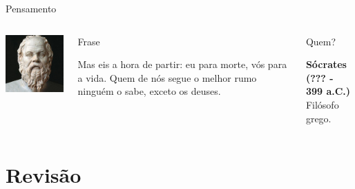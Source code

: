 \documentclass[xcolor=dvipsnames,table]{beamer}
\begin{document}
	\begin{frame}{Pensamento}
		\begin{columns}
		  		\begin{center}
		    		\includegraphics[width=.9\textwidth]{images/socrates.jpg}
		  		\end{center}
				\begin{block}{Frase}
					\begin{center}
						{\large Mas eis a hora de partir: eu para morte, vós para a vida. Quem de nós segue o melhor rumo ninguém o sabe, exceto os deuses.}
					\end{center}
				\end{block}		  		
		  		\begin{block}{Quem?}
		  			\begin{center}
						{\bf Sócrates (??? - 399 a.C.)} \\Filósofo grego.
					\end{center}
				\end{block}
		\end{columns}
	\end{frame}
    
    \section{Revisão}
\end{document}
